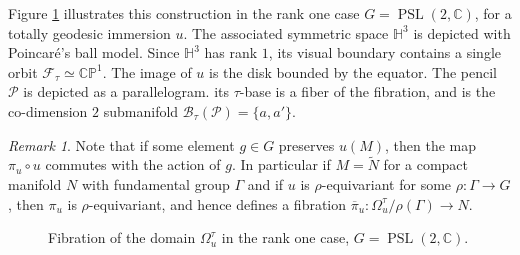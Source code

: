 \documentclass[reqno,10pt]{amsart}
\theoremstyle{plain}
\theoremstyle{definition}
\theoremstyle{remark}
\newtheorem{rem}[thm]{Remark}
\newcommand{\type}{\tau}
\newcommand{\C}{\mathbb{C}}
\DeclareMathOperator{\PSL}{PSL}
\newcommand{\X}{\mathbb{X}}
\begin{document}
Figure \ref{fig:FibrationDoD} illustrates this construction in the rank one case $G=\PSL(2,\C)$, for a totally geodesic immersion $u$. The  associated symmetric space $\mathbb{H}^3$ is depicted with Poincaré's ball model. Since $\mathbb{H}^3$ has rank $1$, its visual boundary contains a single orbit $\mathcal{F}_\type\simeq\mathbb{CP}^1$.  The image of $u$ is the disk bounded by the equator. The pencil $\mathcal{P}$ is depicted as a parallelogram. its $\type$-base is a fiber of the fibration, and is the co-dimension $2$ submanifold $\mathcal{B}_\type(\mathcal{P})=\lbrace a,a'\rbrace$.

\begin{rem}
Note that if some element $g\in G$ preserves $u(M)$, then the map $\pi_u\circ u$ commutes with the action of $g$. In particular if $M=\tilde{N}$ for a compact manifold $N$ with fundamental group $\Gamma$ and if $u$ is $\rho$-equivariant for some $\rho:\Gamma\to G$, then $\pi_u$ is $\rho$-equivariant, and hence defines a fibration $\overline{\pi}_u:\Omega_u^\type/\rho(\Gamma)\to N$.
\end{rem}

\begin{figure}
\begin{center}
\end{center}
\caption{Fibration of the domain $\Omega^\type_u$ in the rank one case, $G=\PSL(2,\C)$.}
\label{fig:FibrationDoD}
\end{figure}
\medskip
\end{document}
